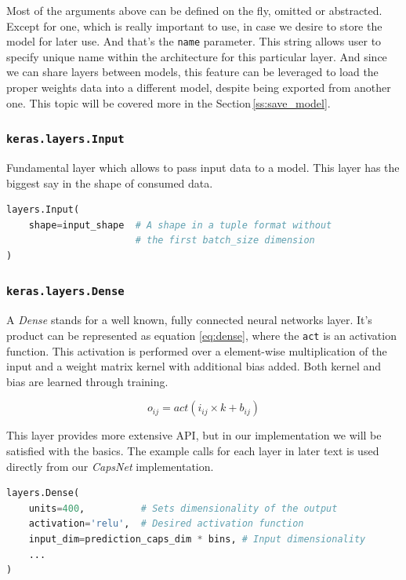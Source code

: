 Most of the arguments above can be defined on the fly, omitted or abstracted. Except for one, which is really important to use, in case we desire to store the model for later use. And that's the \texttt{name} parameter. This string allows user to specify unique name within the architecture for this particular layer. And since we can share layers between models, this feature can be leveraged to load the proper weights data into a different model, despite being exported from another one. This topic will be covered more in the Section\,\ref{ss:save_model}.

\subsubsection{\texttt{keras.layers.Input}}

Fundamental layer which allows to pass input data to a model. This layer has the biggest say in the shape of consumed data.

\begin{lstlisting}[language=Python, caption=Input layer]
layers.Input(
    shape=input_shape  # A shape in a tuple format without
                       # the first batch_size dimension
)
\end{lstlisting}

\subsubsection{\texttt{keras.layers.Dense}}

A \textit{Dense} stands for a well known, fully connected neural networks layer. It's product can be represented as equation \ref{eq:dense}, where the \texttt{act} is an activation function. This activation is performed over a element-wise multiplication of the input and a weight matrix kernel with additional bias added. Both kernel and bias are learned through training.

\begin{equation}
    o_{ij} = act(i_{ij} \times k + b_{ij})
    \label{eq:dense}
\end{equation}

This layer provides more extensive API, but in our implementation we will be satisfied with the basics. The example calls for each layer in later text is used directly from our \textit{CapsNet} implementation.

\begin{lstlisting}[language=Python, caption=Dense layer]
layers.Dense(
    units=400,          # Sets dimensionality of the output
    activation='relu',  # Desired activation function
    input_dim=prediction_caps_dim * bins, # Input dimensionality
    ...
)
\end{lstlisting}

